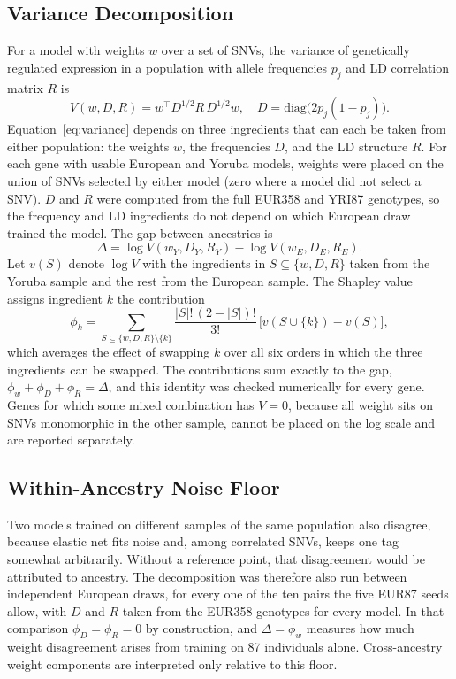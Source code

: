 \documentclass[conference]{IEEEtran}
\begin{document}
\subsection{Variance Decomposition}
For a model with weights $w$ over a set of SNVs, the variance of genetically regulated expression in a population with allele frequencies $p_j$ and LD correlation matrix $R$ is
\begin{equation}
V(w, D, R) = w^{\top} D^{1/2} R\, D^{1/2} w, \quad D = \mathrm{diag}\big(2 p_j (1 - p_j)\big).
\label{eq:variance}
\end{equation}
Equation~\eqref{eq:variance} depends on three ingredients that can each be taken from either population: the weights $w$, the frequencies $D$, and the LD structure $R$. For each gene with usable European and Yoruba models, weights were placed on the union of SNVs selected by either model (zero where a model did not select a SNV). $D$ and $R$ were computed from the full EUR358 and YRI87 genotypes, so the frequency and LD ingredients do not depend on which European draw trained the model. The gap between ancestries is
\begin{equation}
\Delta = \log V(w_Y, D_Y, R_Y) - \log V(w_E, D_E, R_E).
\label{eq:gap}
\end{equation}
Let $v(S)$ denote $\log V$ with the ingredients in $S \subseteq \{w, D, R\}$ taken from the Yoruba sample and the rest from the European sample. The Shapley value~\cite{shapley1953,owen2014} assigns ingredient $k$ the contribution
\begin{equation}
\phi_k = \sum_{S \subseteq \{w,D,R\} \setminus \{k\}} \frac{|S|!\,(2 - |S|)!}{3!}\,\big[v(S \cup \{k\}) - v(S)\big],
\label{eq:shapley}
\end{equation}
which averages the effect of swapping $k$ over all six orders in which the three ingredients can be swapped. The contributions sum exactly to the gap, $\phi_w + \phi_D + \phi_R = \Delta$, and this identity was checked numerically for every gene. Genes for which some mixed combination has $V = 0$, because all weight sits on SNVs monomorphic in the other sample, cannot be placed on the log scale and are reported separately.

\subsection{Within-Ancestry Noise Floor}
Two models trained on different samples of the same population also disagree, because elastic net fits noise and, among correlated SNVs, keeps one tag somewhat arbitrarily. Without a reference point, that disagreement would be attributed to ancestry. The decomposition was therefore also run between independent European draws, for every one of the ten pairs the five EUR87 seeds allow, with $D$ and $R$ taken from the EUR358 genotypes for every model. In that comparison $\phi_D = \phi_R = 0$ by construction, and $\Delta = \phi_w$ measures how much weight disagreement arises from training on 87 individuals alone. Cross-ancestry weight components are interpreted only relative to this floor.
\end{document}
